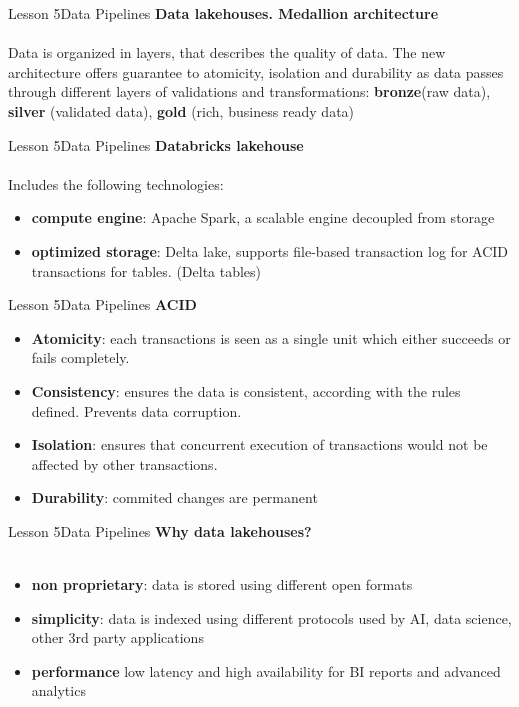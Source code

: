 \documentclass[aspectratio=1610]{beamer}
\begin{document}
\begin{frame}{Lesson 5}{Data Pipelines}
\LARGE
\textbf{Data lakehouses. Medallion architecture}\\~\\
 Data is organized in layers, that describes the quality of data.
 The new architecture offers guarantee to atomicity, isolation and
 durability as data passes through different layers of validations
 and transformations: \textbf{bronze}(raw data), \textbf{silver} 
 (validated data), \textbf{gold} (rich, business ready data)
\end{frame}



\begin{frame}{Lesson 5}{Data Pipelines}
\LARGE
\textbf{Databricks lakehouse}\\~\\
Includes the following technologies:
\begin{itemize}
    \item \textbf{compute engine}: Apache Spark, a scalable engine decoupled from storage
    \item \textbf{optimized storage}: Delta lake, supports file-based transaction log for \alert{ACID} transactions for tables. (Delta tables)
\end{itemize}
\end{frame}



\begin{frame}{Lesson 5}{Data Pipelines}
\LARGE
\textbf{ACID}\\
\begin{itemize}
    \item \textbf{Atomicity}: each transactions is seen as a single unit which either succeeds or fails completely. 
    \item \textbf{Consistency}: ensures the data is consistent, according with the rules defined. Prevents data corruption.
    \item \textbf{Isolation}: ensures that concurrent execution of transactions would not be affected by other transactions.
    \item \textbf{Durability}: commited changes are permanent
\end{itemize}
\end{frame}



\begin{frame}{Lesson 5}{Data Pipelines}
\LARGE
\textbf{Why data lakehouses?}\\~\\
\begin{itemize}
    \item \textbf{non proprietary}: data is stored using different open formats
    \item \textbf{simplicity}: data is indexed using different protocols used by AI, data science, other 3rd party applications 
    \item \textbf{performance} low latency and high availability for BI reports and advanced analytics
\end{itemize}
\end{frame}
\end{document}
